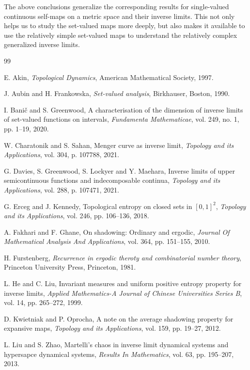\documentclass[12pt]{amsart}
\theoremstyle{definition}
\begin{document}
The above conclusions generalize the corresponding results for single-valued continuous self-maps on a metric
space and their inverse limits. This not only helps us
to study the set-valued maps more deeply, but also makes it available to use the
relatively simple set-valued maps to understand the relatively complex generalized
inverse limits.
\begin{thebibliography}{99}
	
	E. Akin,
	\textit{Topological Dynamics},
	American Mathematical Society, 1997.
	
	J. Aubin and H. Frankowska,
	\textit{Set-valued analysis},
	Birkhauser, Boston, 1990.
	
	I. Bani{\v c} and S. Greenwood,
	A characterisation of the dimension of inverse limits of set-valued functions on intervals,
	\textit{Fundamenta Mathematicae},
	vol. 249, no. 1, pp. 1--19, 2020.
	
	W. Charatonik and S. Sahan,
	Menger curve as inverse limit,
	\textit{Topology and its Applications},
	vol. 304, p. 107788, 2021.
	
	G. Davies, S. Greenwood, S. Lockyer and Y. Maehara,
	Inverse limits of upper semicontinuous functions and indecomposable continua,
	\textit{Topology and its Applications},
	vol. 288, p. 107471, 2021.
	
	G. Erceg and J. Kennedy,
	Topological entropy on closed sets in $[0,1]^2$,
	\textit{Topology and its Applications},
	vol. 246, pp. 106--136, 2018.
	
	A. Fakhari and F. Ghane,
	On shadowing: Ordinary and ergodic,
	\textit{Journal Of Mathematical Analysis And Applications},
	vol. 364, pp. 151--155, 2010.
	
	H. Furstenberg,
	\textit{Recurrence in ergodic theroty and combinatorial number theory},
	Princeton University Press, Princeton, 1981.
	
	L. He and C. Liu,
	Invariant measures and uniform positive entropy property for inverse limits,
	\textit{Applied Mathematics-A Journal of Chinese Universities Series B},
	vol. 14, pp. 265--272, 1999.
	
	D. Kwietniak and P. Oprocha,
	A note on the average shadowing property for expansive maps,
	\textit{Topology and its Applications},
	vol. 159, pp. 19--27, 2012.
	
	L. Liu and S. Zhao,
	Martelli's chaos in inverse limit dynamical systems and hypersapce dynamical systems,
	\textit{Results In Mathematics},
	vol. 63, pp. 195--207, 2013.
	

\end{thebibliography}
\end{document}
